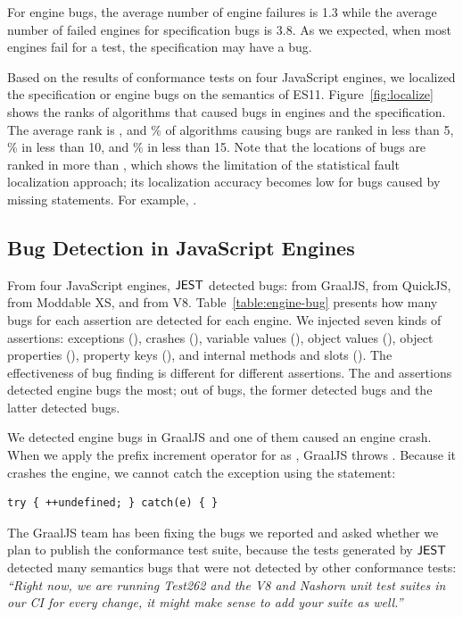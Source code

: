 \noindent
For engine bugs, the average number of engine failures is 1.3
while the average number of failed engines for specification bugs is 3.8.
As we expected, when most engines fail for a test, the specification
may have a bug.

Based on the results of conformance tests on four JavaScript engines, we localized
the specification or engine bugs on the semantics of ES11.
Figure~\ref{fig:localize} shows the ranks of algorithms that caused
 bugs in engines and the specification.
The average rank is , and \% of algorithms causing
bugs are ranked in less than 5, \% in less than 10, and \% in less than 15.
Note that the locations of  bugs are ranked in more than ,
which shows the limitation of the statistical fault localization approach;
its localization accuracy becomes low for bugs caused by missing statements.
For example, .



\subsection{Bug Detection in JavaScript Engines}
From four JavaScript engines, $\tool$ detected  bugs:
 from GraalJS,  from QuickJS,
 from Moddable XS, and  from V8.
Table~\ref{table:engine-bug} presents how many bugs for each assertion are detected
for each engine.  We injected seven kinds of assertions: exceptions
(), crashes (), variable values (), object
values (), object properties (), property keys
(), and internal methods and slots ().
The effectiveness of bug finding is different for different assertions.
The  and  assertions detected
engine bugs the most; out of  bugs, the former detected  bugs
and the latter detected  bugs.

We detected  engine bugs in GraalJS and one of them caused an engine
crash.  When we apply the prefix increment operator for 
as , GraalJS throws .
Because it crashes the engine, we cannot catch the exception using the
 statement:
\begin{lstlisting}[style=myJSstyle]
    try { ++undefined; } catch(e) { }
\end{lstlisting}
The GraalJS team has been fixing the bugs we reported and
asked whether we plan to publish the conformance test suite,
because the tests generated by $\tool$ detected many semantics bugs that
were not detected by other conformance tests:
\emph{``Right now, we are running Test262 and the V8 and Nashorn
unit test suites in our CI for every change, it might make sense to
add your suite as well.''}

